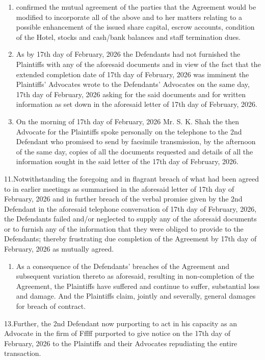 \documentclass[12pt,a4paper]{article}
\begin{document}
\begin{enumerate}
\item confirmed the mutual agreement of the parties that the Agreement would be modified to incorporate all of the above and to her matters relating to a possible enhancement of the issued share capital, escrow accounts, condition of the Hotel, stocks and cash/bank balances and staff termination dues.

\item As by 17th day of February, 2026 the Defendants had not furnished the Plaintiffs with any of the aforesaid documents and in view of the fact that the extended completion date of 17th day of February, 2026 was imminent the Plaintiffs' Advocates wrote to the Defendants' Advocates on the same day, 17th day of February, 2026 asking for the said documents and for written information as set down in the aforesaid letter of 17th day of February, 2026.

\item On the morning of 17th day of February, 2026 Mr. S. K. Shah the then Advocate for the Plaintiffs spoke personally on the telephone to the 2nd Defendant who promised to send by facsimile transmission, by the afternoon of the same day, copies of all the documents requested and details of all the information sought in the said letter of the 17th day of February, 2026.

\end{enumerate}
\begin{justify}11.Notwithstanding the foregoing and in flagrant breach of what had been agreed to in earlier meetings as summarised in the aforesaid letter of 17th day of February, 2026 and in further breach of the verbal promise given by the 2nd Defendant in the aforesaid telephone conversation of 17th day of February, 2026, the Defendants failed and/or neglected to supply any of the aforesaid documents or to furnish any of the information that they were obliged to provide to the Defendants; thereby frustrating due completion of the Agreement by 17th day of February, 2026 as mutually agreed.\end{justify}


\begin{enumerate}
\item      As a consequence of the Defendants' breaches of the Agreement and subsequent variation thereto as aforesaid, resulting in non-completion of the Agreement, the Plaintiffs have suffered and continue to suffer, substantial loss and damage.  And the Plaintiffs claim, jointly and severally, general damages for breach of contract.

\end{enumerate}
\begin{justify}13.Further, the 2nd Defendant now purporting to act in his capacity as an Advocate in the firm of Fffff purported to give notice on the 17th day of February, 2026 to the Plaintiffs and their Advocates repudiating the entire transaction.\end{justify}
\end{document}
